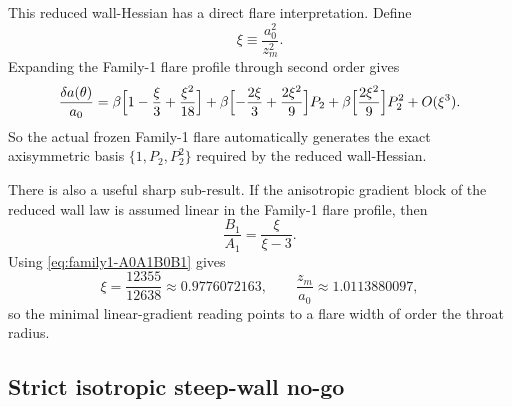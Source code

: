 \documentclass[11pt]{article}
\begin{document}
This reduced wall-Hessian has a direct flare interpretation.  Define
\begin{equation}
\xi\equiv \frac{a_0^2}{z_m^2}.
\label{eq:family1-xi}
\end{equation}
Expanding the Family-1 flare profile through second order gives
\begin{equation}
\frac{\delta a(\theta)}{a_0}
=
\beta\Bigl[1-\frac{\xi}{3}+\frac{\xi^2}{18}\Bigr]
+
\beta\Bigl[-\frac{2\xi}{3}+\frac{2\xi^2}{9}\Bigr]P_2
+
\beta\Bigl[\frac{2\xi^2}{9}\Bigr]P_2^2
+O(\xi^3).
\label{eq:family1-flare-P2-P2sq}
\end{equation}
So the actual frozen Family-1 flare automatically generates the exact axisymmetric basis
\(\{1,P_2,P_2^2\}\) required by the reduced wall-Hessian.

There is also a useful sharp sub-result.  If the anisotropic gradient block of the
reduced wall law is assumed linear in the Family-1 flare profile, then
\begin{equation}
\frac{B_1}{A_1}=\frac{\xi}{\xi-3}.
\label{eq:family1-linear-gradient-ratio}
\end{equation}
Using \cref{eq:family1-A0A1B0B1} gives
\begin{equation}
\xi=\frac{12355}{12638}\approx 0.9776072163,
\qquad
\frac{z_m}{a_0}\approx 1.0113880097,
\label{eq:family1-zm-over-a0}
\end{equation}
so the minimal linear-gradient reading points to a flare width of order the throat
radius.

\subsection{Strict isotropic steep-wall no-go}
\label{app:family1-strict}
\end{document}
